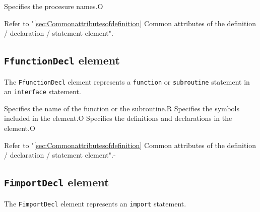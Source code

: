 \begin{XcodeMLChildElements}
{Specifies the procesure names.}{O}
\end{XcodeMLChildElements}

\begin{XcodeMLAttributes}
{Refer to "\ref{sec:Commonattributesofdefinition} Common attributes of the definition / declaration / statement element".}{-}
\end{XcodeMLAttributes}


\subsection{ {\tt FfunctionDecl} element}

The {\tt FfunctionDecl} element represents a {\tt function} or {\tt subroutine} statement in an {\tt interface} statement.


\begin{XcodeMLChildElements}
{Specifies the name of the function or the subroutine.}{R}
{Specifies the symbols included in the element.}{O}
{Specifies the definitions and declarations in the element.}{O}
\end{XcodeMLChildElements}

\begin{XcodeMLAttributes}
{Refer to "\ref{sec:Commonattributesofdefinition} Common attributes of the definition / declaration / statement element".}{-}
\end{XcodeMLAttributes}


\subsection{ {\tt FimportDecl} element}

The {\tt FimportDecl} element represents an {\tt import} statement.



